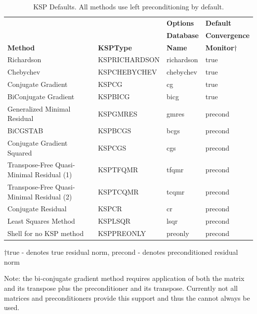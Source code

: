 \begin{table}
\begin{center}
\begin{tabular}{llll}
& & {\bf Options}       & {\bf Default}\\
& & {\bf Database}      & {\bf Convergence}\\
{\bf Method}    &{\bf KSPType}  & {\bf Name}    & {\bf Monitor$\dagger$}\\
\hline
Richardson                                & KSPRICHARDSON & richardson  & true\\
Chebychev                                 & KSPCHEBYCHEV  & chebychev   & true\\
Conjugate Gradient \cite{hs:52}           & KSPCG         & cg          & true\\
BiConjugate Gradient                      & KSPBICG       & bicg        & true\\
Generalized Minimal Residual \cite{ss:86} & KSPGMRES      & gmres       & precond\\
BiCGSTAB \cite{v:92}                      & KSPBCGS       & bcgs        & precond \\
Conjugate Gradient Squared \cite{so:89}   & KSPCGS        & cgs         & precond \\
Transpose-Free Quasi-Minimal Residual (1) \cite{f:93} & KSPTFQMR & tfqmr & precond \\
Transpose-Free Quasi-Minimal Residual (2) & KSPTCQMR & tcqmr & precond \\
Conjugate Residual                        & KSPCR         & cr          & precond \\
Least Squares Method                      & KSPLSQR       & lsqr        & precond \\
Shell for no KSP method                   & KSPPREONLY    & preonly     & precond \\
\hline
\end{tabular}
\medskip \medskip
$\dagger$true - denotes true residual norm, precond - denotes preconditioned residual norm
\end{center}
\caption{KSP Defaults.  All methods use left preconditioning by default.}
\label{tab_kspdefaults}
\end{table}

Note: the bi-conjugate gradient method requires application of both the matrix and 
its transpose plus the preconditioner and its transpose. Currently not all matrices
and preconditioners provide this support and thus the  cannot always 
be used.  

